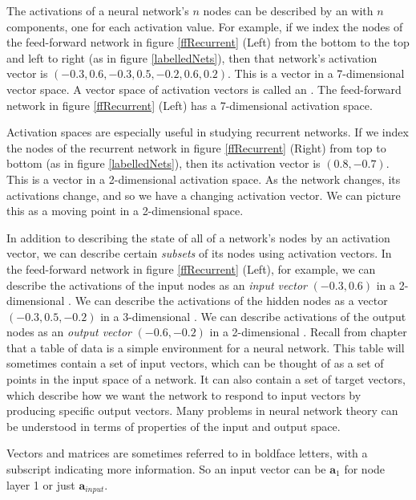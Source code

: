   The activations of a neural network's $n$ nodes can be described by an  with $n$ components, one for each activation value. For example, if we index the nodes of the feed-forward network in figure \ref{ffRecurrent} (Left) from the bottom to the top and left to right (as in figure \ref{labelledNets}), then that network's activation vector is $(-0.3,0.6,-0.3,0.5,-0.2,0.6,0.2)$. This
is a vector in a 7-dimensional vector space. A vector space of activation 
vectors is called an . The feed-forward network in figure \ref{ffRecurrent} (Left) has a 7-dimensional activation space.

Activation spaces are especially useful in studying recurrent networks. If we index the nodes of the recurrent network in figure \ref{ffRecurrent} (Right) from top to bottom (as in figure \ref{labelledNets}), then its activation vector is $(0.8,-0.7)$. This is a vector in a 2-dimensional activation
space. As the network changes, its activations change, and so we have a changing activation vector. We can picture  this as a moving point in a 2-dimensional space. 

In addition to describing the state of all of a network's nodes by an activation vector, we can describe certain {\em subsets} of its nodes using activation vectors. In the feed-forward network in figure \ref{ffRecurrent} (Left), for example, we can describe the activations of the input nodes as an  \emph{input vector}  $(-0.3,0.6)$  in a 2-dimensional . We can describe the activations of the hidden nodes as a vector $(-0.3,0.5,-0.2)$ in a 3-dimensional 
. We can describe activations of the output nodes as an \emph{output vector} $(-0.6,-0.2)$ in a 2-dimensional . Recall from chapter  that a table of data is a simple environment for a neural network. This table will sometimes contain a set of input vectors, which can be thought of as a set of points in the input space of a network. It can also contain a set of target vectors, which describe how we want the network to respond to input vectors by producing specific output vectors. Many problems in neural network theory can be understood in terms of properties of the input and output space.
 
 Vectors and matrices are sometimes referred to in boldface letters, with a subscript indicating more information. So an input vector can be $\textbf{a}_{1}$ for node layer 1 or just $\textbf{a}_{input}$.

